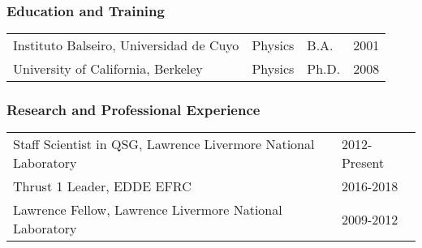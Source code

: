 \subsubsection*{Education and Training}

\begin{table}[ht]
    \centering
\begin{tabular}{llll} 
Instituto Balseiro, Universidad de Cuyo& Physics & B.A. & 2001 \\ 
University of California, Berkeley & Physics & Ph.D. & 2008 \\
\end{tabular}
\end{table}

\subsubsection*{Research and Professional Experience}
\begin{table}[ht]
\centering
\begin{tabular}{ll} 
Staff Scientist in QSG, Lawrence Livermore National Laboratory & 2012-Present\\
Thrust 1 Leader, EDDE EFRC & 2016-2018 \\
Lawrence Fellow, Lawrence Livermore National Laboratory & 2009-2012 \\
\end{tabular}
\end{table}

